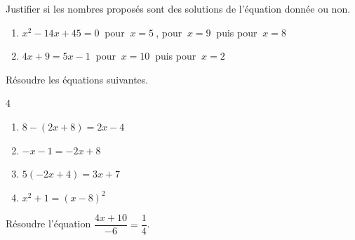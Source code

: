 \documentclass[a4paper,11pt,fleqn]{article}
\begin{document}
\begin{EXO}{}{}
Justifier si les nombres proposés sont des solutions de l'équation donnée ou non.


\begin{enumerate}
	\item $x^2-14x+45=0~$ pour $~x=5~$, pour $~x=9~$ puis pour $~x=8$
	\item $4x+9=5x-1~$ pour $~x=10~$ puis pour $~x=2$
\end{enumerate}
\end{EXO}

\begin{EXO}{}{}
Résoudre les équations suivantes.

\begin{multicols}{4}
\begin{enumerate}[itemsep=1em]
	\item \begin{minipage}[t]{\linewidth} $8-(2x+8)=2x-4$

 \end{minipage}
	\item \begin{minipage}[t]{\linewidth} $-x-1=-2x+8$

 \end{minipage}
	\item \begin{minipage}[t]{\linewidth} $5(-2x+4)=3x+7$

 \end{minipage}
	\item \begin{minipage}[t]{\linewidth} $x^2+1=(x-8)^2$

 \end{minipage}
\end{enumerate}
\end{multicols}
\end{EXO}

\begin{EXO}{}{}



  Résoudre l'équation $\dfrac{4x+10}{-6}=\dfrac{1}{4}$.
\end{EXO}
\end{document}
